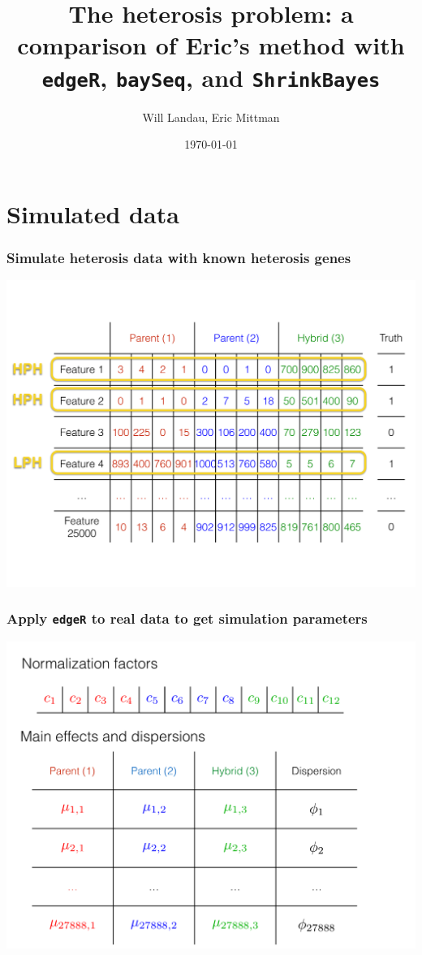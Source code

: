 \documentclass[handout]{beamer}
\title{The heterosis problem: a comparison of Eric's method with {\tt edgeR}, {\tt baySeq}, and {\tt ShrinkBayes}}
\author{Will Landau, Eric Mittman}
\date{\today}
\institute{Iowa State University}
\numberwithin{equation}{section}
\begin{document}
\begin{frame}
\titlepage
\end{frame}


\section{Simulated data}

\begin{frame}
\frametitle{Simulate heterosis data with known heterosis genes}
\begin{center}
\includegraphics[scale=.28]{data}
\end{center}
\end{frame}

\begin{frame}
\frametitle{Apply {\tt edgeR} to real data to get simulation parameters}
\begin{center}
\includegraphics[scale=.25]{parms}
\end{center}
\end{frame}
\end{document}
